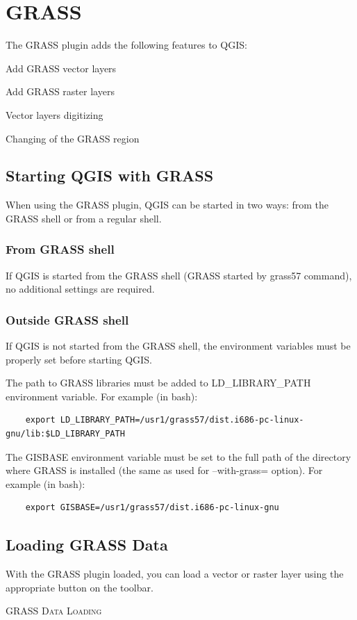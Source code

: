 \section{GRASS}\label{sec:grass}
The GRASS plugin adds the following features to QGIS:
\begin{compactitem}
\item Add GRASS vector layers
\item Add GRASS raster layers
\item Vector layers digitizing
\item Changing of the GRASS region
\end{compactitem}
\subsection{Starting QGIS with
GRASS}\label{sec:starting_grass}
When using the GRASS plugin, QGIS can be started in two ways: from the GRASS shell or from a regular shell.
\subsubsection{From GRASS shell}

If QGIS is started from the GRASS shell (GRASS started by grass57 command), no
additional settings are required. 
\subsubsection{Outside GRASS shell}

If QGIS is not started from the GRASS shell, the environment variables must be properly set before starting QGIS.
 
The path to GRASS libraries must be added to LD\_LIBRARY\_PATH environment
variable. For example (in bash): 
\begin{verbatim}
    export LD_LIBRARY_PATH=/usr1/grass57/dist.i686-pc-linux-gnu/lib:$LD_LIBRARY_PATH
\end{verbatim}    
 
The GISBASE environment variable must be set to the full path of the directory where GRASS is installed (the same as used for --with-grass= option). For example (in bash):
\begin{verbatim}
    export GISBASE=/usr1/grass57/dist.i686-pc-linux-gnu 
\end{verbatim}
\subsection{Loading GRASS Data}
With the GRASS plugin loaded, you can load a vector or raster layer using the appropriate button on the toolbar. \begin{Tip}\caption{\textsc{GRASS Data Loading}}
\end{Tip} 
